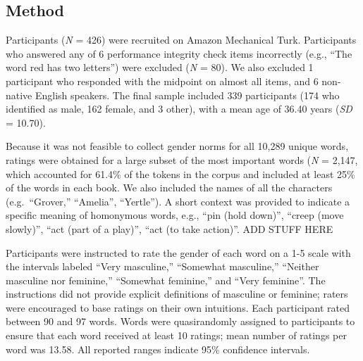 \documentclass[english,,man,floatsintext]{apa6}
\begin{document}
\hypertarget{method}{%
\subsection{Method}\label{method}}

Participants (\emph{N} = 426) were recruited on Amazon Mechanical Turk. Participants who answered any of 6 performance integrity check items incorrectly (e.g., \enquote{The word red has two letters}) were excluded (\emph{N} = 80). We also excluded 1 participant who responded with the midpoint on almost all items, and 6 non-native English speakers. The final sample included 339 participants (174 who identified as male, 162 female, and 3 other), with a mean age of 36.40 years (\emph{SD} = 10.70).

Because it was not feasible to collect gender norms for all 10,289 unique words, ratings were obtained for a large subset of the most important words (\emph{N} = 2,147, which accounted for 61.4\% of the tokens in the corpus and included at least 25\% of the words in each book. We also included the names of all the characters (e.g.~\enquote{Grover,} \enquote{Amelia}, \enquote{Yertle}). A short context was provided to indicate a specific meaning of homonymous words, e.g., \enquote{pin (hold down)}, \enquote{creep (move slowly)}, \enquote{act (part of a play)}, \enquote{act (to take action)}. ADD STUFF HERE

Participants were instructed to rate the gender of each word on a 1-5 scale with the intervals labeled \enquote{Very masculine,} \enquote{Somewhat masculine,} \enquote{Neither masculine nor feminine,} \enquote{Somewhat feminine,} and \enquote{Very feminine}. The instructions did not provide explicit definitions of masculine or feminine; raters were encouraged to base ratings on their own intuitions. Each participant rated between 90 and 97 words. Words were quasirandomly assigned to participants to ensure that each word received at least 10 ratings; mean number of ratings per word was 13.58. All reported ranges indicate 95\% confidence intervals.
\end{document}
